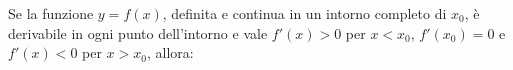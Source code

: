 Se la funzione $y=f(x)$, definita e continua in un intorno completo di $x_0$, 
è derivabile in ogni punto
dell’intorno e vale $f'(x)>0$ per $x<x_0$, $f'(x_0)=0$ e $f'(x)<0$ per
$x>x_0$, allora:
